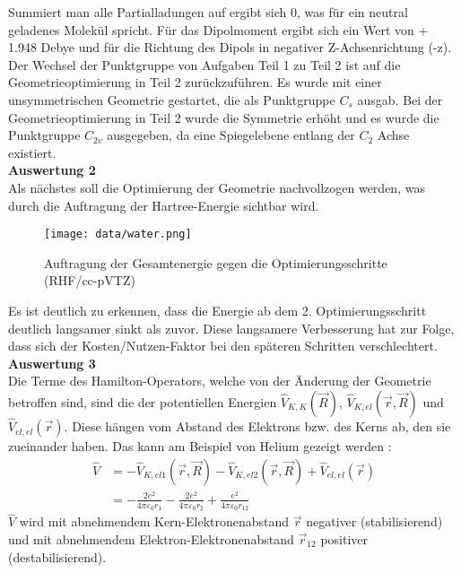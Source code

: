 \documentclass[12pt]{article}
\begin{document}
\begin{onehalfspace}
\begin{table}[htbp]
\begin{tabular}{lr}
\end{tabular}
\end{table}
\noindent
Summiert man alle Partialladungen auf ergibt sich 0, was für ein neutral geladenes Molekül spricht.
Für das Dipolmoment ergibt sich ein Wert von + 1.948 Debye und für die Richtung des Dipols in negativer Z-Achsenrichtung (-z).
Der Wechsel der Punktgruppe von Aufgaben Teil 1 zu Teil 2 ist auf die Geometrieoptimierung in Teil 2 zurückzuführen.
 Es wurde mit einer unsymmetrischen Geometrie gestartet, die als Punktgruppe $C _s$ ausgab.
  Bei der Geometrieoptimierung in Teil 2 wurde die Symmetrie erhöht und es wurde die Punktgruppe $C _{2v}$ ausgegeben,
  da eine Spiegelebene entlang der $C _2$ Achse existiert.\\
\noindent
\textbf{Auswertung 2}\\
Als nächstes soll die Optimierung der Geometrie nachvollzogen werden, was durch die Auftragung der Hartree-Energie sichtbar wird.
\begin{figure}[!htp]
\centering
  \texttt{[image: data/water.png]}%
  \caption{Auftragung der Gesamtenergie gegen die Optimierungsschritte (RHF/cc-pVTZ)}
\end{figure}
Es ist deutlich zu erkennen, dass die Energie ab dem 2. Optimierungsschritt deutlich langsamer sinkt als zuvor. Diese langsamere Verbesserung hat zur Folge, dass sich der Kosten/Nutzen-Faktor bei den späteren Schritten verschlechtert.\\
\newpage
\noindent
\textbf{Auswertung 3}\\
Die Terme des Hamilton-Operators, welche von der Änderung der Geometrie betroffen sind, sind die der potentiellen Energien
$\hat{V} _{K,K}(\vec{R})$, $\hat{V} _{K,el}(\vec{r},\vec{R})$ und $\hat{V} _{el,el}(\vec{r})$.
Diese hängen vom Abstand des Elektrons bzw. des Kerns ab, den sie zueinander haben. Das kann am Beispiel von Helium gezeigt werden \cite{atkins219}:\\
\begin{align*}
\hat{V} &= - \hat{V} _{K,el1}(\vec{r},\vec{R}) - \hat{V} _{K,el2}(\vec{r},\vec{R})  + \hat{V} _{el,el}(\vec{r}) \\
  &= - \frac{2e^2}{4\pi \varepsilon _0 r _1} - \frac{2e^2}{4\pi \varepsilon _0 r _2} +  \frac{e^2}{4\pi \varepsilon _0 r _{12}}
\end{align*}
$\hat{V}$ wird mit abnehmendem Kern-Elektronenabstand $\vec{r}$ negativer (stabilisierend) und mit abnehmendem Elektron-Elektronenabstand $\vec{r} _{12}$ positiver (destabilisierend).


\end{onehalfspace}
\end{document}

